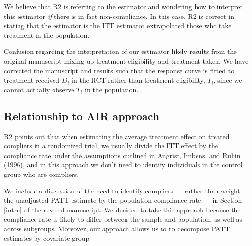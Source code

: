 \documentclass[hidelinks,12pt,letterpaper]{article}
\begin{document}
We believe that R2 is referring to the \citet{Hartman} estimator and wondering how to interpret this estimator \emph{if} there is in fact non-compliance. In this case, R2 is correct in stating that the \citet{Hartman} estimator is the ITT estimator extrapolated those who take treatment in the population. 

Confusion regarding the interpretation of our estimator likely results from the original manuscript mixing up treatment eligibility and treatment taken. We have corrected the manuscript and results such that the response curve is fitted to treatment received $D_i$ in the RCT rather than treatment eligibility, $T_i$, since we cannot actually observe $T_i$ in the population. 

\subsection{Relationship to AIR approach}\label{reweighting}

R2 points out that when estimating the average treatment effect on treated compliers in a randomized trial, we usually divide the ITT effect by the compliance rate under the assumptions outlined in Angrist, Imbens, and Rubin (1996), and in this approach we don't need to identify individuals in the control group who are compliers.

We include a discussion of the need to identify compliers --- rather than weight the unadjusted PATT estimate by the population compliance rate --- in Section \ref{intro} of the revised manuscript. We decided to take this approach because the compliance rate is likely to differ between the sample and population, as well as across subgroups. Moreover, our approach allows us to to decompose PATT estimates by covariate group. 
\end{document}
